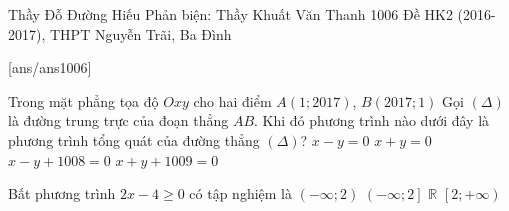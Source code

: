 \begin{name}
{Thầy Đỗ Đường Hiếu \newline Phản biện: Thầy Khuất Văn Thanh}
{1006 Đề HK2 (2016-2017), THPT Nguyễn Trãi, Ba Đình}%
\end{name}
\setcounter{ex}{0}\setcounter{bt}{0}
[ans/ans1006]
\begin{ex}%
Trong mặt phẳng tọa độ $Oxy$ cho hai điểm $A(1;2017)$, $B(2017;1)$ Gọi $(\Delta)$ là đường trung trực của đoạn thẳng $AB$. Khi đó phương trình nào dưới đây là phương trình tổng quát của đường thẳng $(\Delta)$?
\choice
{\True $x-y=0$}
{$x+y=0$}
{$x-y+1008=0$}
{$x+y+1009=0$}
\end{ex}

\begin{ex}%
Bất phương trình $2x-4 \ge 0$ có tập nghiệm là
\choice
{$(-\infty;2)$}
{$\left(-\infty;2\right]$}
{$\mathbb{R}$}
{\True $\left[2;+\infty\right)$}
\end{ex}


